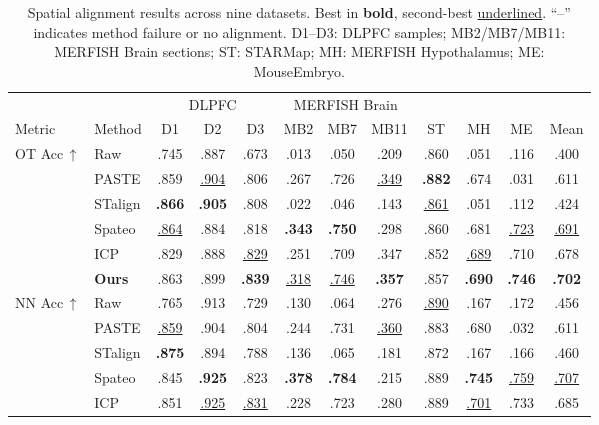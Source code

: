 \documentclass[runningheads]{llncs}
\begin{document}
\begin{table}[t]
\centering
\caption{Spatial alignment results across nine datasets. Best in \textbf{bold}, second-best \underline{underlined}. ``--'' indicates method failure or no alignment. D1--D3: DLPFC samples; MB2/MB7/MB11: MERFISH Brain sections; ST: STARMap; MH: MERFISH Hypothalamus; ME: MouseEmbryo.}
\label{tab:alignment}
\setlength{\tabcolsep}{3pt}
{\fontsize{8}{9.5}\selectfont
\begin{tabular}{@{}l l ccc ccc c c c c@{}}
\toprule
& & \multicolumn{3}{c}{DLPFC} & \multicolumn{3}{c}{MERFISH Brain} & & & & \\
\cmidrule(lr){3-5}\cmidrule(lr){6-8}
Metric & Method & D1 & D2 & D3 & MB2 & MB7 & MB11 & ST & MH & ME & Mean \\
\midrule
\multirow{6}{*}{OT Acc\,$\uparrow$}
& Raw            & .745 & .887 & .673 & .013 & .050 & .209 & .860 & .051 & .116 & .400 \\
& PASTE          & .859 & \underline{.904} & .806 & .267 & .726 & \underline{.349} & \textbf{.882} & .674 & .031 & .611 \\
& STalign        & \textbf{.866} & \textbf{.905} & .808 & .022 & .046 & .143 & \underline{.861} & .051 & .112 & .424 \\
& Spateo         & \underline{.864} & .884 & .818 & \textbf{.343} & \textbf{.750} & .298 & .860 & .681 & \underline{.723} & \underline{.691} \\
& ICP            & .829 & .888 & \underline{.829} & .251 & .709 & .347 & .852 & \underline{.689} & .710 & .678 \\
& \textbf{Ours}  & .863 & .899 & \textbf{.839} & \underline{.318} & \underline{.746} & \textbf{.357} & .857 & \textbf{.690} & \textbf{.746} & \textbf{.702} \\
\midrule
\multirow{6}{*}{NN Acc\,$\uparrow$}
& Raw            & .765 & .913 & .729 & .130 & .064 & .276 & \underline{.890} & .167 & .172 & .456 \\
& PASTE          & \underline{.859} & .904 & .804 & .244 & .731 & \underline{.360} & .883 & .680 & .032 & .611 \\
& STalign        & \textbf{.875} & .894 & .788 & .136 & .065 & .181 & .872 & .167 & .166 & .460 \\
& Spateo         & .845 & \textbf{.925} & .823 & \textbf{.378} & \textbf{.784} & .215 & .889 & \textbf{.745} & \underline{.759} & \underline{.707} \\
& ICP            & .851 & \underline{.925} & \underline{.831} & .228 & .723 & .280 & .889 & \underline{.701} & .733 & .685 \\

\end{tabular}}
\end{table}
\end{document}
